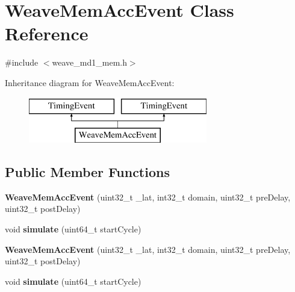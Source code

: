\hypertarget{classWeaveMemAccEvent}{\section{Weave\-Mem\-Acc\-Event Class Reference}
\label{classWeaveMemAccEvent}
}


{\ttfamily \#include $<$weave\-\_\-md1\-\_\-mem.\-h$>$}

Inheritance diagram for Weave\-Mem\-Acc\-Event\-:\begin{figure}[H]
\begin{center}
\leavevmode
\includegraphics[height=2.000000cm]{classWeaveMemAccEvent}
\end{center}
\end{figure}
\subsection*{Public Member Functions}
\begin{DoxyCompactItemize}
\item 
\hypertarget{classWeaveMemAccEvent_a7a2ded9186ed5d07f16a31ef9b52632c}{{\bfseries Weave\-Mem\-Acc\-Event} (uint32\-\_\-t \-\_\-lat, int32\-\_\-t domain, uint32\-\_\-t pre\-Delay, uint32\-\_\-t post\-Delay)}\label{classWeaveMemAccEvent_a7a2ded9186ed5d07f16a31ef9b52632c}

\item 
\hypertarget{classWeaveMemAccEvent_a6442984d0f26abc0222378325f1f9703}{void {\bfseries simulate} (uint64\-\_\-t start\-Cycle)}\label{classWeaveMemAccEvent_a6442984d0f26abc0222378325f1f9703}

\item 
\hypertarget{classWeaveMemAccEvent_a7a2ded9186ed5d07f16a31ef9b52632c}{{\bfseries Weave\-Mem\-Acc\-Event} (uint32\-\_\-t \-\_\-lat, int32\-\_\-t domain, uint32\-\_\-t pre\-Delay, uint32\-\_\-t post\-Delay)}\label{classWeaveMemAccEvent_a7a2ded9186ed5d07f16a31ef9b52632c}

\item 
\hypertarget{classWeaveMemAccEvent_a6442984d0f26abc0222378325f1f9703}{void {\bfseries simulate} (uint64\-\_\-t start\-Cycle)}\label{classWeaveMemAccEvent_a6442984d0f26abc0222378325f1f9703}

\end{DoxyCompactItemize}
